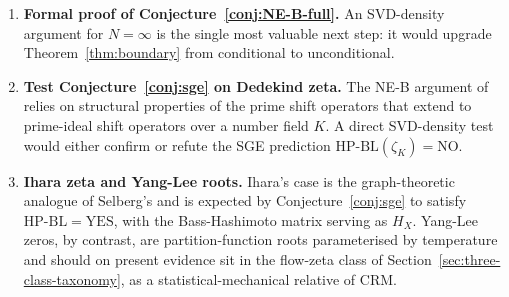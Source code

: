 \documentclass[11pt]{article}
\theoremstyle{definition}
\theoremstyle{remark}
\newcommand{\HBL}{\mathrm{HP\text{-}BL}}
\begin{document}
\begin{enumerate}
\item \textbf{Formal proof of Conjecture~\ref{conj:NE-B-full}.} An
  SVD-density argument for $N = \infty$ is the single most valuable
  next step: it would upgrade Theorem~\ref{thm:boundary} from
  conditional to unconditional.
\item \textbf{Test Conjecture~\ref{conj:sge} on Dedekind zeta.} The
  NE-B argument of \cite{Geiger2026RHII} relies on structural
  properties of the prime shift operators that extend to
  prime-ideal shift operators over a number field $K$. A direct
  SVD-density test would either confirm or refute the SGE prediction
  $\HBL(\zeta_K) = \mathrm{NO}$.
\item \textbf{Ihara zeta and Yang-Lee roots.} Ihara's case is the
  graph-theoretic analogue of Selberg's and is expected by
  Conjecture~\ref{conj:sge} to satisfy $\HBL = \mathrm{YES}$, with
  the Bass-Hashimoto matrix serving as $H_X$. Yang-Lee zeros, by
  contrast, are partition-function roots parameterised by
  temperature and should on present evidence sit in the flow-zeta
  class of Section~\ref{sec:three-class-taxonomy}, as a
  statistical-mechanical relative of CRM.


\end{enumerate}
\end{document}
